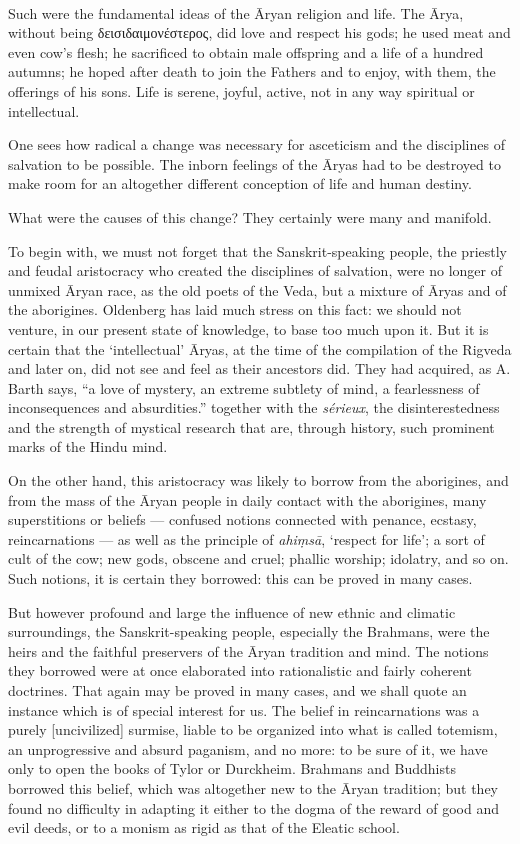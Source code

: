 \documentclass[a4paper, 11pt, oneside, english]{article}
\begin{document}
\paragraph{}
Such were the fundamental ideas of the Āryan religion and life. The Ārya, without being δεισιδαιμονέστερος, did love and respect his gods; he used meat and even cow's flesh; he sacrificed to obtain male offspring and a life of a hundred autumns; he hoped after death to join the Fathers and to enjoy, with them, the offerings of his sons. Life is serene, joyful, active, not in any way spiritual or intellectual.

One sees how radical a change was necessary for asceticism and the disciplines of salvation to be possible. The inborn feelings of the Āryas had to be destroyed to make room for an altogether different conception of life and human destiny.

What were the causes of this change? They certainly were many and manifold.

To begin with, we must not forget that the Sanskrit-speaking people, the priestly and feudal aristocracy who created the disciplines of salvation, were no longer of unmixed Āryan race, as the old poets of the Veda, but a mixture of Āryas and of the aborigines. Oldenberg has laid much stress on this fact: we should not venture, in our present state of knowledge, to base too much upon it. But it is certain that the `intellectual' Āryas, at the time of the compilation of the Rigveda and later on, did not see and feel as their ancestors did. They had acquired, as A. Barth says, ``a love of mystery, an extreme subtlety of mind, a fearlessness of inconsequences and absurdities.'' together with the \emph{sérieux}, the disinterestedness and the strength of mystical research that are, through history, such prominent marks of the Hindu mind.

On the other hand, this aristocracy was likely to borrow from the aborigines, and from the mass of the Āryan people in daily contact with the aborigines, many superstitions or beliefs --- confused notions connected with penance, ecstasy, reincarnations --- as well as the principle of \emph{ahiṃsā}, `respect for life'; a sort of cult of the cow; new gods, obscene and cruel; phallic worship; idolatry, and so on. Such notions, it is certain they borrowed: this can be proved in many cases.

But however profound and large the influence of new ethnic and climatic surroundings, the Sanskrit-speaking people, especially the Brahmans, were the heirs and the faithful preservers of the Āryan tradition and mind. The notions they borrowed were at once elaborated into rationalistic and fairly coherent doctrines. That again may be proved in many cases, and we shall quote an instance which is of special interest for us. The belief in reincarnations was a purely [uncivilized] surmise, liable to be organized into what is called totemism, an unprogressive and absurd paganism, and no more: to be sure of it, we have only to open the books of Tylor or Durckheim. Brahmans and Buddhists borrowed this belief, which was altogether new to the Āryan tradition; but they found no difficulty in adapting it either to the dogma of the reward of good and evil deeds, or to a monism as rigid as that of the Eleatic school.
\end{document}
